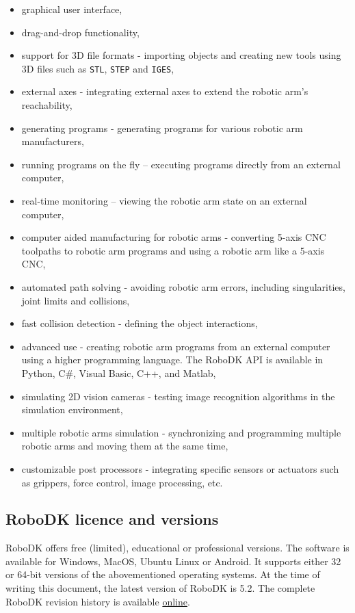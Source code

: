 \begin{itemize}
\item graphical user interface,
\item drag-and-drop functionality, 
\item support for 3D file formats - importing objects and creating new tools using 3D files such as \texttt{STL}, \texttt{STEP} and \texttt{IGES},
\item external axes - integrating external axes to extend the robotic arm’s reachability,
\item generating programs - generating programs for various robotic arm manufacturers,
\item running programs on the fly – executing programs directly from an external computer,
\item real-time monitoring – viewing the robotic arm state on an external computer,
\item computer aided manufacturing for robotic arms - converting 5-axis CNC toolpaths to robotic arm programs and using a robotic arm like a 5-axis CNC,
\item automated path solving - avoiding robotic arm errors, including singularities, joint limits and collisions,
\item fast collision detection - defining the object interactions, 
\item advanced use - creating robotic arm programs from an external computer using a higher programming language. The RoboDK API is available in Python, C\#, Visual Basic, C++, and Matlab,
\item simulating 2D vision cameras - testing image recognition algorithms in the simulation environment,
\item multiple robotic arms simulation - synchronizing and programming multiple robotic arms and moving them at the same time, 
\item customizable post processors - integrating specific sensors or actuators such as grippers, force control, image processing, etc.
\end{itemize}

\subsection{RoboDK licence and versions}

RoboDK offers free (limited), educational or professional versions. 
The software is available for Windows, MacOS, Ubuntu Linux or Android. It supports either 32 or 64-bit versions of the abovementioned operating systems. At the time of writing this document, the latest version of RoboDK is 5.2. The complete RoboDK revision history is available \href{https://robodk.com/whatsnew}{online}. 

